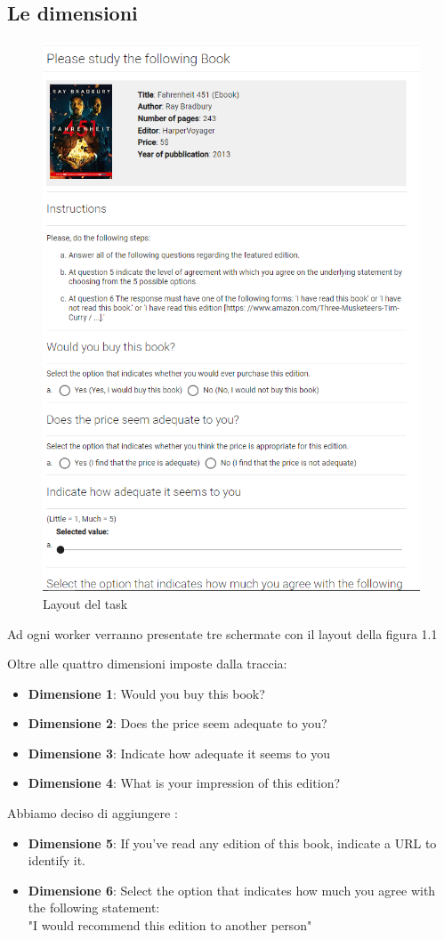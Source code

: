 \documentclass[a4paper,11pt]{report}
\begin{document}
\subsection{Le dimensioni}
\begin{figure}[H]
	\centering
	\includegraphics[width=0.9\linewidth]{task}
	\caption{Layout del task}
	\label{fig:task_layout}
\end{figure}

Ad ogni worker verranno presentate tre schermate con il layout della figura 1.1
\pagebreak

Oltre alle quattro dimensioni imposte dalla traccia:
\begin{itemize}
	\item \textbf{Dimensione 1}: Would you buy this book?
	\item \textbf{Dimensione 2}: Does the price seem adequate to you?
	\item \textbf{Dimensione 3}: Indicate how adequate it seems to you
	\item \textbf{Dimensione 4}: What is your impression of this edition?
\end{itemize}
Abbiamo deciso di aggiungere :
\begin{itemize}
	\item \textbf{Dimensione 5}: If you've read any edition of this book, indicate a URL to identify it.
	\item \textbf{Dimensione 6}: Select the option that indicates how much you agree with the following statement: \\ "I would recommend this edition to another person"
\end{itemize}
\end{document}
